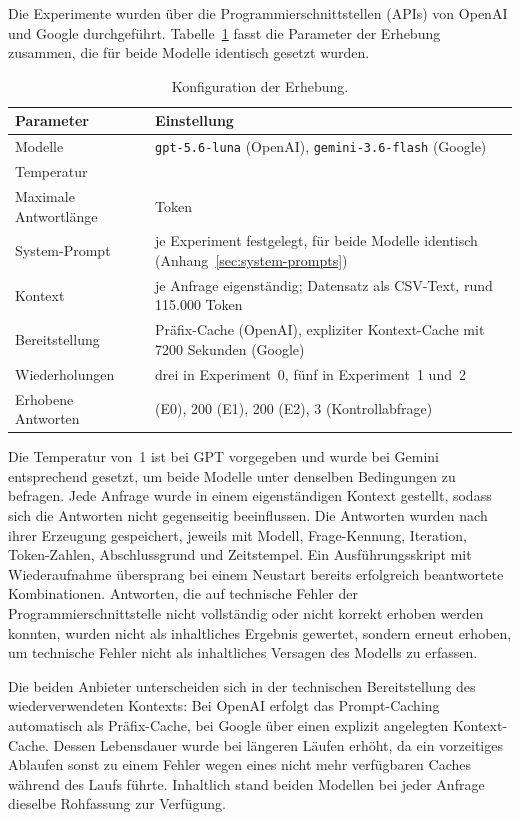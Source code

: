 Die Experimente wurden über die Programmierschnittstellen (APIs) von OpenAI und Google durchgeführt. Tabelle~\ref{tab:erhebungsparameter} fasst die Parameter der Erhebung zusammen, die für beide Modelle identisch gesetzt wurden.

\begin{table}[htbp]
\centering
\caption{Konfiguration der Erhebung.}
\label{tab:erhebungsparameter}
\renewcommand{\arraystretch}{1.2}
\begin{tabularx}{\textwidth}{@{} l >{\raggedright\arraybackslash}X @{}}
\toprule
\textbf{Parameter} & \textbf{Einstellung} \\
\midrule
Modelle & \texttt{gpt-5.6-luna} (OpenAI), \texttt{gemini-3.6-flash} (Google) \\
Temperatur & 1 \\
Maximale Antwortlänge & 8000 Token \\
System-Prompt & je Experiment festgelegt, für beide Modelle identisch (Anhang~\ref{sec:system-prompts}) \\
Kontext & je Anfrage eigenständig; Datensatz als CSV-Text, rund 115.000 Token \\
Bereitstellung & Präfix-Cache (OpenAI), expliziter Kontext-Cache mit 7200 Sekunden (Google) \\
Wiederholungen & drei in Experiment~0, fünf in Experiment~1 und~2 \\
Erhobene Antworten & 90 (E0), 200 (E1), 200 (E2), 3 (Kontrollabfrage) \\
\bottomrule
\end{tabularx}
\end{table}

Die Temperatur von~1 ist bei GPT vorgegeben und wurde bei Gemini entsprechend gesetzt, um beide Modelle unter denselben Bedingungen zu befragen. Jede Anfrage wurde in einem eigenständigen Kontext gestellt, sodass sich die Antworten nicht gegenseitig beeinflussen. Die Antworten wurden nach ihrer Erzeugung gespeichert, jeweils mit Modell, Frage-Kennung, Iteration, Token-Zahlen, Abschlussgrund und Zeitstempel. Ein Ausführungsskript mit Wiederaufnahme übersprang bei einem Neustart bereits erfolgreich beantwortete Kombinationen. Antworten, die auf technische Fehler der Programmierschnittstelle nicht vollständig oder nicht korrekt erhoben werden konnten, wurden nicht als inhaltliches Ergebnis gewertet, sondern erneut erhoben, um technische Fehler nicht als inhaltliches Versagen des Modells zu erfassen.

Die beiden Anbieter unterscheiden sich in der technischen Bereitstellung des wiederverwendeten Kontexts: Bei OpenAI erfolgt das Prompt-Caching automatisch als Präfix-Cache, bei Google über einen explizit angelegten Kontext-Cache. Dessen Lebensdauer wurde bei längeren Läufen erhöht, da ein vorzeitiges Ablaufen sonst zu einem Fehler wegen eines nicht mehr verfügbaren Caches während des Laufs führte. Inhaltlich stand beiden Modellen bei jeder Anfrage dieselbe Rohfassung zur Verfügung.

